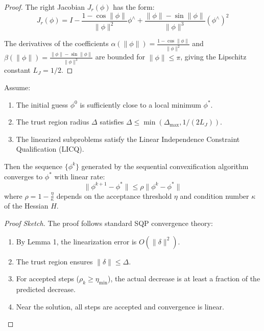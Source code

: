 \begin{proof}
The right Jacobian $J_r(\phi)$ has the form:
\begin{equation}
J_r(\phi) = I - \frac{1-\cos\|\phi\|}{\|\phi\|^2} \phi^\wedge + \frac{\|\phi\| - \sin\|\phi\|}{\|\phi\|^3} (\phi^\wedge)^2
\end{equation}

The derivatives of the coefficients $\alpha(\|\phi\|) = \frac{1-\cos\|\phi\|}{\|\phi\|^2}$ and $\beta(\|\phi\|) = \frac{\|\phi\| - \sin\|\phi\|}{\|\phi\|^3}$ are bounded for $\|\phi\| \leq \pi$, giving the Lipschitz constant $L_J = 1/2$.
\end{proof}

\begin{theorem}
Assume:
\begin{enumerate}
\item The initial guess $\phi^0$ is sufficiently close to a local minimum $\phi^*$.
\item The trust region radius $\Delta$ satisfies $\Delta \leq \min(\Delta_{\max}, 1/(2L_J))$.
\item The linearized subproblems satisfy the Linear Independence Constraint Qualification (LICQ).
\end{enumerate}

Then the sequence $\{\phi^k\}$ generated by the sequential convexification algorithm converges to $\phi^*$ with linear rate:
\begin{equation}
\|\phi^{k+1} - \phi^*\| \leq \rho \|\phi^k - \phi^*\|
\end{equation}
where $\rho = 1 - \frac{\eta}{\kappa}$ depends on the acceptance threshold $\eta$ and condition number $\kappa$ of the Hessian $H$.
\end{theorem}

\begin{proof}[Proof Sketch]
The proof follows standard SQP convergence theory:
\begin{enumerate}
\item By Lemma 1, the linearization error is $O(\|\delta\|^2)$.
\item The trust region ensures $\|\delta\| \leq \Delta$.
\item For accepted steps ($\rho_k \geq \eta_{\min}$), the actual decrease is at least a fraction of the predicted decrease.
\item Near the solution, all steps are accepted and convergence is linear.
\end{enumerate}
\end{proof}

